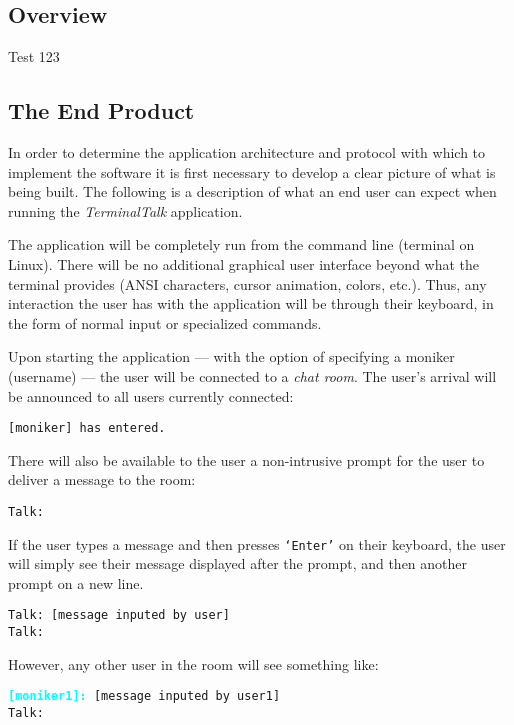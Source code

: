 \subsection{Overview}
Test 123
\subsection{The End Product}
In order to determine the application architecture and protocol with which to implement the software it is first necessary to develop a clear picture of what is being built. The following is a description of what an end user can expect when running the \textsl{TerminalTalk} application.

The application will be completely run from the command line (terminal on Linux). There will be no additional graphical user interface beyond what the terminal provides (ANSI characters, cursor animation, colors, etc.). Thus, any interaction the user has with the application will be through their keyboard, in the form of normal input or specialized commands. 

Upon starting the application --- with the option of specifying a moniker (username) --- the user will be connected to a \emph{chat room}. The user's arrival will be announced to all users currently connected:

\begin{displayquote}
 \texttt{[moniker] has entered.}
\end{displayquote}

There will also be available to the user a non-intrusive prompt for the user to deliver a message to the room:

\begin{displayquote}
 \texttt{Talk:}
\end{displayquote}
 
 If the user types a message and then presses \texttt{`Enter'} on their keyboard, the user will simply see their message displayed after the prompt, and then another prompt on a new line. 
 
\begin{displayquote}
 \texttt{Talk: [message inputed by user]} \\
 \texttt{Talk:}
\end{displayquote}

However, any other user in the room will see something like:

\begin{displayquote}
	\texttt{\textbf{\textcolor{cyan}{[moniker1]:}} [message inputed by user1]} \\
	\texttt{Talk:}
\end{displayquote}

